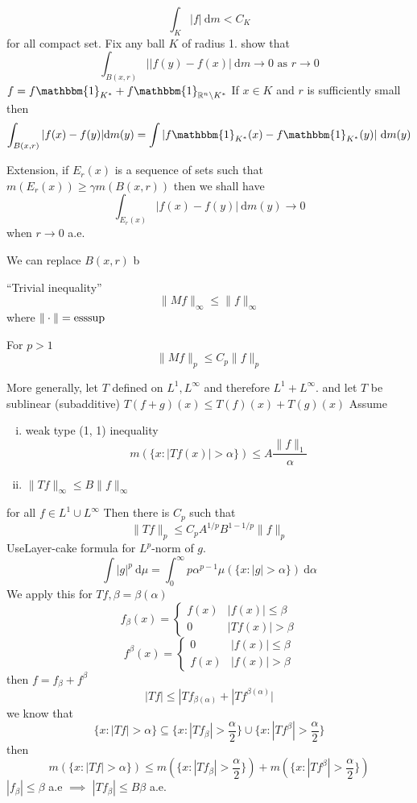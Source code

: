 \[\int_K |f| \ \mathrm{d}m < C_K\]
for all compact set.
Fix any ball $K$ of radius 1. show that
\[\int_{B(x, r)}||f(y) - f(x)| \ \mathrm dm \to 0 \text{ as } r \to 0\]
$f = f \mathbbm{1}_{K^*} + f \mathbbm{1}_{\RR^n \setminus K^*}$
If $x \in K$ and $r$ is sufficiently small then
\[\int_{B(x, r)} |f(x) - f(y)| \mathrm{d}m(y) = \int |f \mathbbm{1}_{K^*}(x) - f \mathbbm{1}_{K^*}(y)| \ \mathrm{d}m(y)\]

Extension, if $E_r(x)$ is a sequence of sets such that
$m(E_r(x)) \ge \gamma m(B(x, r))$
then we shall have 
\[\int_{E_r(x)} |f(x) - f(y)| \ \mathrm{d}m(y) \to 0\]
when $r\to 0$ a.e.

We can replace $B(x, r)$ b


``Trivial inequality''
\[\|Mf\|_\infty \le \|f\|_\infty\]
where $\|\cdot\| = \operatorname*{ess sup}$

\begin{theorem}
  For $p > 1$ 
  \[\|Mf\|_p \le C_p \|f\|_p\]
\end{theorem}
More generally, let $T$ defined on $L^1, L^\infty$ and therefore $L^1 + L^\infty$.
and let $T$ be sublinear (subadditive) $T(f + g){(x)} \le T(f)(x) + T(g)(x)$
Assume
\begin{enumerate}[(i)]
  \item weak type (1, 1) inequality
  \[m(\{x : |Tf(x)| > \alpha\}) \le A \frac{\|f\|_1}{\alpha}\]
  \item $\|Tf\|_\infty \le B\|f\|_\infty$
\end{enumerate}
for all $f \in L^1 \cup L^\infty$
Then there is $C_p$ such that 
\[\|Tf\|_p \le C_p A^{1/p} B^{1-1/p}\|f\|_p\]
UseLayer-cake formula for $L^p$-norm of $g$.
\[\int|g|^p \ \mathrm{d}\mu = \int_0^\infty p\alpha^{p-1} \mu(\{x : |g| > \alpha\}) \ \mathrm{d}\alpha\]
We apply this for $Tf, \beta = \beta(\alpha)$
\[f_\beta(x) = \begin{cases}
  f(x) & |f(x)| \le \beta \\
  0 & |Tf(x)| > \beta 
\end{cases}\]
\[f^\beta(x) = \begin{cases}
  0 & |f(x)| \le \beta \\
  f(x) & |f(x)| > \beta
\end{cases}\]
then $f = f_\beta + f^\beta$ 
\[|Tf| \le |Tf_{\beta(\alpha)} + |Tf^{\beta(\alpha)}|\]
we know that
\[\{x : |Tf| > \alpha \} \subseteq \{x : |Tf_\beta| > \frac\alpha2\} \cup\{x : |Tf^\beta| > \frac\alpha2\} \]
then
\[m(\{x : |Tf| > \alpha \}) \le m(\{x : |Tf_\beta| > \frac\alpha2\})+ m(\{x : |Tf^\beta| > \frac\alpha2\})\]
$|f_\beta| \le \beta$ a.e $\implies$ $|Tf_\beta| \le B\beta$ a.e.

